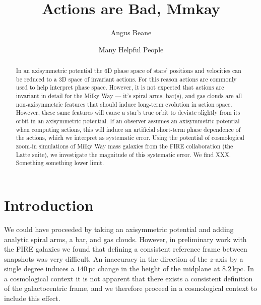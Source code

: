 \documentclass[twocolumn]{aastex62}
\newcommand{\pc}{\text{pc}}
\newcommand{\kpc}{\text{kpc}}
\begin{document}
\title{Actions are Bad, Mmkay}


\author{Angus Beane}

\author{Many Helpful People}
\noaffiliation

\begin{abstract}

In an axisymmetric potential the 6D phase space of stars' positions and
velocities can be reduced to a 3D space of invariant actions. For this reason
actions are commonly used to help interpret phase space. However, it is not
expected that actions are invariant in detail for the Milky Way --- it's
spiral arms, bar(s), and gas clouds are all non-axisymmetric features that
should induce long-term evolution in action space. However, these same
features will cause a star's true orbit to deviate slightly from its orbit in
an axisymmetric potential. If an observer assumes an axisymmetric potential
when computing actions, this will induce an artificial short-term phase
dependence of the actions, which we interpret as systematic error. Using the
potential of cosmological zoom-in simulations of Milky Way mass galaxies from
the FIRE collaboration (the Latte suite), we investigate the magnitude of
this systematic error. We find XXX. Something something lower limit.

\end{abstract}


\section{Introduction} \label{sec:intro}


We could have proceeded by taking an axisymmetric potential and adding
analytic spiral arms, a bar, and gas clouds. However, in preliminary work
with the FIRE galaxies we found that defining a consistent reference frame
between snapshots was very difficult. An inaccuracy in the direction of the
$z$-axis by a single degree induces a $140\,\pc$ change in the height of the
midplane at $8.2\,\kpc$. In a cosmological context it is not apparent that
there exists a consistent definition of the galactocentric frame, and we
therefore proceed in a cosmological context to include this effect.
\end{document}
